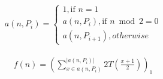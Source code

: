 \documentclass{article}
\begin{document}

\begin{align*}
    a(n, P_{i}) = \begin{cases}
                1, \text{if } n = 1\\
                a(n, P_{i}), \text{if } n \bmod 2 = 0\\
                a(n, P_{i + 1}), otherwise
            \end{cases}
\end{align*}


\begin{align*}
    f(n) = \left( \sum_{x \in a(n, P_{i})}^{|a(n, P_{i})|}{2T(\frac{x + 1}{2})} \right)_{1}
\end{align*}
\end{document}
